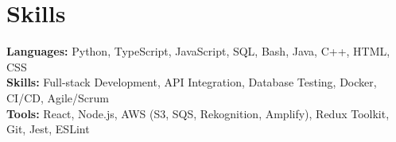 \documentclass[11pt]{article}       %
\begin{document}

\vspace{-18.5pt}


\section*{Skills}
\textbf{Languages:} Python, TypeScript, JavaScript, SQL, Bash, Java, C++, HTML, CSS\\
\textbf{Skills:} Full-stack Development, API Integration, Database Testing, Docker, CI/CD, Agile/Scrum\\
\textbf{Tools:} React, Node.js, AWS (S3, SQS, Rekognition, Amplify), Redux Toolkit, Git, Jest, ESLint\\

\vspace{-6.5pt}
\end{document}
